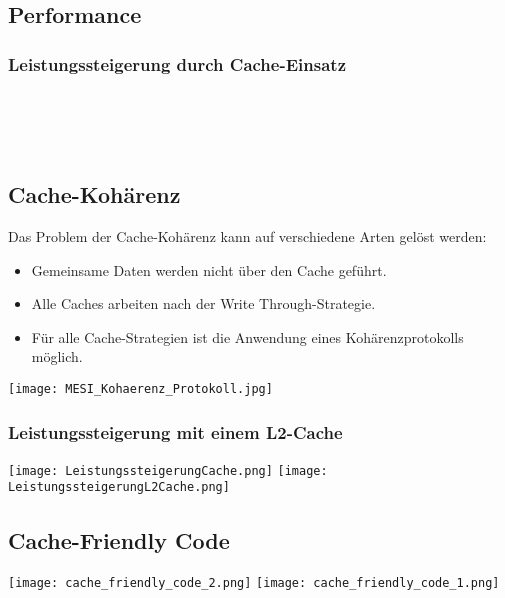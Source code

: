 \subsection{Performance}


\subsubsection{Leistungssteigerung durch Cache-Einsatz}


\\
\\
\\

\subsection{Cache-Kohärenz}

Das Problem der Cache-Kohärenz kann auf verschiedene Arten gelöst werden:

\begin{itemize}
    \itemsep-.5em 
    \item Gemeinsame Daten werden nicht über den Cache geführt.
    \item Alle Caches arbeiten nach der Write Through-Strategie.
    \item Für alle Cache-Strategien ist die Anwendung eines Kohärenzprotokolls möglich.
\end{itemize}

\texttt{[image: MESI\_Kohaerenz\_Protokoll.jpg]}
\subsubsection{Leistungssteigerung mit einem L2-Cache}


\begin{center}
	\texttt{[image: LeistungssteigerungCache.png]}
	\texttt{[image: LeistungssteigerungL2Cache.png]}
\end{center}


\subsection{Cache-Friendly Code}

\texttt{[image: cache\_friendly\_code\_2.png]}
\texttt{[image: cache\_friendly\_code\_1.png]}